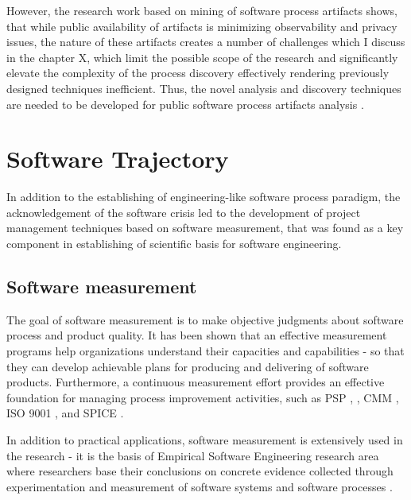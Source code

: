 However, the research work based on mining of software process artifacts shows, that while public availability 
of artifacts is minimizing observability and privacy issues, the nature of these artifacts creates a number of 
challenges which I discuss in the chapter X, which limit the possible scope of the research and significantly 
elevate the complexity of the process discovery effectively rendering previously designed techniques inefficient.
Thus, the novel analysis and discovery techniques are needed to be developed for public software process artifacts 
analysis \cite{citeulike:7853299}.

%
%
\section{Software Trajectory}\label{sec_software_trajectory}
In addition to the establishing of engineering-like software process paradigm, the acknowledgement of 
the software crisis led to the development of project management techniques based on software measurement, 
that was found as a key component in establishing of scientific basis for software engineering.

\subsection{Software measurement}\label{sec_software_metrics}
The goal of software measurement is to make objective judgments about software process and product quality. 
It has been shown that an effective measurement programs help organizations understand their capacities and 
capabilities - so that they can develop achievable plans for producing and delivering of software products. 
Furthermore, a continuous measurement effort provides an effective foundation for managing process 
improvement activities, such as PSP \cite{citeulike:8347315}, \cite{citeulike:5090131} 
\cite{citeulike:12929216}, CMM \cite{citeulike:9962021}, ISO 9001 \cite{iso-standard}, 
and SPICE \cite{spice-standard}.

In addition to practical applications, software measurement is extensively used in the research - it is the basis of 
Empirical Software Engineering research area where researchers base their conclusions on concrete evidence collected 
through experimentation and measurement of software systems and software processes \cite{citeulike:766768}.

